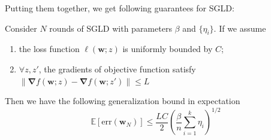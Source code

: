 \documentclass[final,12pt]{colt2018} %
\begin{document}
Putting them together, we get following guarantees for SGLD:

\begin{theorem}
  Consider $N$ rounds of SGLD with parameters $\beta$ and $\{\eta_i\}$. If we assume
  \begin{enumerate}
    \item the loss function $\ell(\bm{w};z)$ is uniformly bounded by $C$;
  \item $\forall z,z'$, the gradients of objective function satisfy $\|\bm{\nabla}f(\bm{w};z)-\bm{\nabla}f(\bm{w};z')\|\le L$
  \end{enumerate}
  Then we have the following generalization bound in expectation
  \begin{equation}
  \label{preliminary}
  \mathbb{E}[\mathrm{err}(\bm{w}_N)]\leq \frac{LC}{2}\left(\frac{\beta}{n}\sum_{i=1}^k\eta_i\right)^{1/2}
  \end{equation}
\end{theorem}
\end{document}

